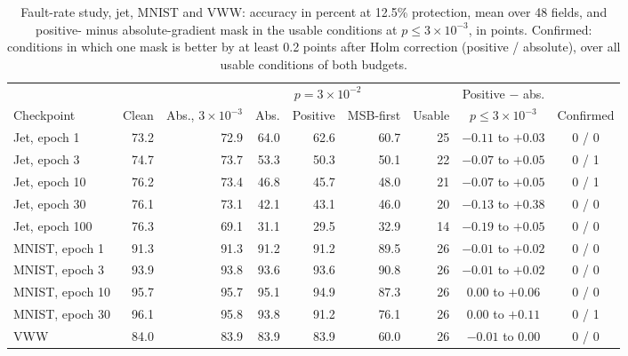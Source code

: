 \begin{table}[h]
\caption{Fault-rate study, jet, MNIST and VWW: accuracy in percent at 12.5\% protection, mean over 48 fields, and positive- minus absolute-gradient mask in the usable conditions at $p\le3\times10^{-3}$, in points. Confirmed: conditions in which one mask is better by at least 0.2 points after Holm correction (positive / absolute), over all usable conditions of both budgets.}\label{tab:newmodels}
\centering\footnotesize\setlength{\tabcolsep}{3.5pt}
\begin{tabular}{l r r r r r r c c}\toprule
 & & & \multicolumn{3}{c}{$p=3\times10^{-2}$} & & Positive $-$ abs. & \\\cmidrule(lr){4-6}
Checkpoint & Clean & Abs., $3\!\times\!10^{-3}$ & Abs. & Positive & MSB-first & Usable & $p\le3\times10^{-3}$ & Confirmed\\\midrule
Jet, epoch 1 & 73.2 & 72.9 & 64.0 & 62.6 & 60.7 & 25 & $-0.11$ to $+0.03$ & 0 / 0\\
Jet, epoch 3 & 74.7 & 73.7 & 53.3 & 50.3 & 50.1 & 22 & $-0.07$ to $+0.05$ & 0 / 1\\
Jet, epoch 10 & 76.2 & 73.4 & 46.8 & 45.7 & 48.0 & 21 & $-0.07$ to $+0.05$ & 0 / 1\\
Jet, epoch 30 & 76.1 & 73.1 & 42.1 & 43.1 & 46.0 & 20 & $-0.13$ to $+0.38$ & 0 / 0\\
Jet, epoch 100 & 76.3 & 69.1 & 31.1 & 29.5 & 32.9 & 14 & $-0.19$ to $+0.05$ & 0 / 0\\
MNIST, epoch 1 & 91.3 & 91.3 & 91.2 & 91.2 & 89.5 & 26 & $-0.01$ to $+0.02$ & 0 / 0\\
MNIST, epoch 3 & 93.9 & 93.8 & 93.6 & 93.6 & 90.8 & 26 & $-0.01$ to $+0.02$ & 0 / 0\\
MNIST, epoch 10 & 95.7 & 95.7 & 95.1 & 94.9 & 87.3 & 26 & $0.00$ to $+0.06$ & 0 / 0\\
MNIST, epoch 30 & 96.1 & 95.8 & 93.8 & 91.2 & 76.1 & 26 & $0.00$ to $+0.11$ & 0 / 1\\
VWW & 84.0 & 83.9 & 83.9 & 83.9 & 60.0 & 26 & $-0.01$ to $0.00$ & 0 / 0\\\bottomrule
\end{tabular}
\end{table}

